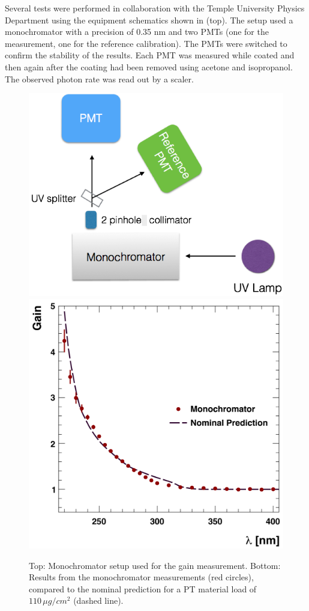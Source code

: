 Several tests were performed in collaboration with the Temple University Physics Department using the equipment schematics
shown in  (top). The setup used a monochromator with a precision of 0.35 nm and two PMTs (one for the measurement,
one for the   reference calibration). The PMTs were switched to confirm the stability of the results. Each PMT was measured
while coated and then again after the coating had been removed using acetone and isopropanol.
The observed photon rate was read out by a scaler.

\begin{figure}[h]
	\centering
	\includegraphics[width=0.95\columnwidth,keepaspectratio]{img/pmtTestingSetup.png}
	\includegraphics[width=0.95\columnwidth,keepaspectratio]{img/ptQEResults.png}
	\caption{Top: Monochromator setup used for the gain measurement. Bottom: Results from the monochromator measurements (red circles), compared to the
				nominal prediction for a PT material load of $110\,\mu g/cm^2$ (dashed line).}
	\label{fig:pmtTestingSetupAndptQEResults}
\end{figure}

